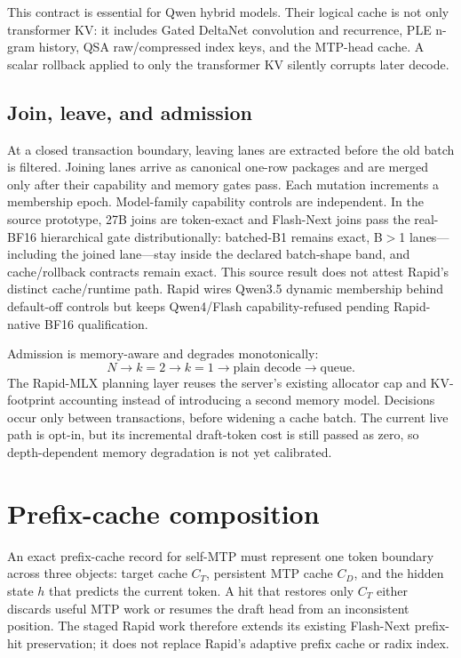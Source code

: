 \documentclass[10pt,twocolumn]{article}
\begin{document}
This contract is essential for Qwen hybrid models.  Their logical cache is not
only transformer KV: it includes Gated DeltaNet convolution and recurrence,
PLE n-gram history, QSA raw/compressed index keys, and the MTP-head cache.  A
scalar rollback applied to only the transformer KV silently corrupts later
decode.

\subsection{Join, leave, and admission}
At a closed transaction boundary, leaving lanes are extracted before the old
batch is filtered.  Joining lanes arrive as canonical one-row packages and
are merged only after their capability and memory gates pass.  Each mutation
increments a membership epoch.  Model-family capability controls are
independent.  In the source prototype, 27B joins are token-exact and Flash-Next
joins pass the real-BF16 hierarchical gate distributionally: batched-B1 remains
exact, B$>$1 lanes---including the joined lane---stay inside the declared
batch-shape band, and cache/rollback contracts remain exact.  This source result
does not attest Rapid's distinct cache/runtime path.  Rapid wires Qwen3.5
dynamic membership behind default-off controls but keeps Qwen4/Flash
capability-refused pending Rapid-native BF16 qualification.

Admission is memory-aware and degrades monotonically:
\begin{equation}
  N \rightarrow k=2 \rightarrow k=1 \rightarrow
  \text{plain decode} \rightarrow \text{queue}.
\end{equation}
The Rapid-MLX planning layer reuses the server's existing allocator cap and
KV-footprint accounting instead of introducing a second memory model.
Decisions occur only between transactions, before widening a cache batch.
The current live path is opt-in, but its incremental draft-token cost is still
passed as zero, so depth-dependent memory degradation is not yet calibrated.

\section{Prefix-cache composition}
An exact prefix-cache record for self-MTP must represent one token boundary
across three objects: target cache $C_T$, persistent MTP cache $C_D$, and the
hidden state $h$ that predicts the current token.  A hit that restores only
$C_T$ either discards useful MTP work or resumes the draft head from an
inconsistent position.  The staged Rapid work therefore extends its existing
Flash-Next prefix-hit preservation; it does not replace Rapid's adaptive
prefix cache or radix index.
\end{document}
